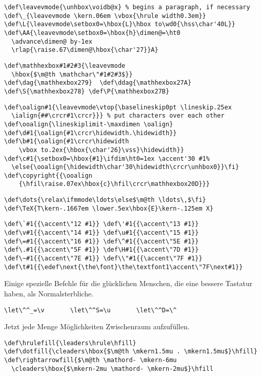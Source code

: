 \begin{appendix}
\begin{verbatim}
\def\leavevmode{\unhbox\voidb@x} % begins a paragraph, if necessary
\def\_{\leavevmode \kern.06em \vbox{\hrule width0.3em}}
\def\L{\leavevmode\setbox0=\hbox{L}\hbox to\wd0{\hss\char'40L}}
\def\AA{\leavevmode\setbox0=\hbox{h}\dimen@=\ht0 
  \advance\dimen@ by-1ex
  \rlap{\raise.67\dimen@\hbox{\char'27}}A}
\end{verbatim}
\begin{verbatim}
\def\mathhexbox#1#2#3{\leavevmode
  \hbox{$\m@th \mathchar\"#1#2#3$}}
\def\dag{\mathhexbox279}  \def\ddag{\mathhexbox27A}
\def\S{\mathhexbox278} \def\P{\mathhexbox27B}
\end{verbatim}
\begin{verbatim}
\def\oalign#1{\leavevmode\vtop{\baselineskip0pt \lineskip.25ex
  \ialign{##\crcr#1\crcr}}} % put characters over each other
\def\ooalign{\lineskiplimit-\maxdimen \oalign}
\def\d#1{\oalign{#1\crcr\hidewidth.\hidewidth}}
\def\b#1{\oalign{#1\crcr\hidewidth
    \vbox to.2ex{\hbox{\char'26}\vss}\hidewidth}}
\def\c#1{\setbox0=\hbox{#1}\ifdim\ht0=1ex \accent'30 #1%
  \else{\ooalign{\hidewidth\char'30\hidewidth\crcr\unhbox0}}\fi}
\def\copyright{{\ooalign
    {\hfil\raise.07ex\hbox{c}\hfil\crcr\mathhexbox20D}}}
\end{verbatim}
\begin{verbatim}
\def\dots{\relax\ifmmode\ldots\else$\m@th \ldots\,$\fi}
\def\TeX{T\kern-.1667em \lower.5ex\hbox{E}\kern-.125em X}
\end{verbatim}
\begin{verbatim}
\def\`#1{{\accent\"12 #1}} \def\'#1{{\accent\"13 #1}}
\def\v#1{{\accent\"14 #1}} \def\u#1{{\accent\"15 #1}}
\def\=#1{{\accent\"16 #1}} \def\^#1{{\accent\"5E #1}}
\def\.#1{{\accent\"5F #1}} \def\H#1{{\accent\"7D #1}}
\def\~#1{{\accent\"7E #1}} \def\\"#1{{\accent\"7F #1}}
\def\t#1{{\edef\next{\the\font}\the\textfont1\accent\"7F\next#1}}
\end{verbatim}
Einige spezielle Befehle f\"ur die gl\"ucklichen Menschen, die eine
bessere Tastatur haben, als Normalsterbliche.
\begin{verbatim}
\let\^^_=\v       \let\^^S=\u       \let\^^D=\^
\end{verbatim}
Jetzt jede Menge M\"oglichkeiten Zwischenraum aufzuf\"ullen.
\begin{verbatim}
\def\hrulefill{\leaders\hrule\hfill}
\def\dotfill{\cleaders\hbox{$\m@th \mkern1.5mu . \mkern1.5mu$}\hfill}
\def\rightarrowfill{$\m@th \mathord- \mkern-6mu
  \cleaders\hbox{$\mkern-2mu \mathord- \mkern-2mu$}\hfill

\end{verbatim}
\end{appendix}
